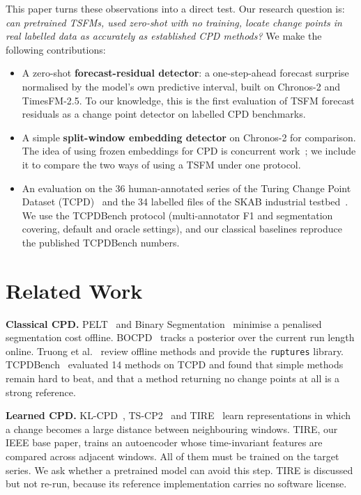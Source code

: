 \documentclass[conference]{IEEEtran}
\begin{document}
This paper turns these observations into a direct test. Our research question is: \emph{can pretrained TSFMs, used zero-shot with no training, locate change points in real labelled data as accurately as established CPD methods?} We make the following contributions:
\begin{itemize}
\item A zero-shot \textbf{forecast-residual detector}: a one-step-ahead forecast surprise normalised by the model's own predictive interval, built on Chronos-2 and TimesFM-2.5. To our knowledge, this is the first evaluation of TSFM forecast residuals as a change point detector on labelled CPD benchmarks.
\item A simple \textbf{split-window embedding detector} on Chronos-2 for comparison. The idea of using frozen embeddings for CPD is concurrent work~\cite{anon2026gasfm}; we include it to compare the two ways of using a TSFM under one protocol.
\item An evaluation on the 36 human-annotated series of the Turing Change Point Dataset (TCPD)~\cite{vandenburg2020evaluation} and the 34 labelled files of the SKAB industrial testbed~\cite{skab}. We use the TCPDBench protocol (multi-annotator F1 and segmentation covering, default and oracle settings), and our classical baselines reproduce the published TCPDBench numbers.
\end{itemize}

\section{Related Work}
\textbf{Classical CPD.} PELT~\cite{killick2012pelt} and Binary Segmentation~\cite{scott1974binseg} minimise a penalised segmentation cost offline. BOCPD~\cite{adams2007bocpd} tracks a posterior over the current run length online. Truong et al.~\cite{truong2020ruptures} review offline methods and provide the \texttt{ruptures} library. TCPDBench~\cite{vandenburg2020evaluation} evaluated 14 methods on TCPD and found that simple methods remain hard to beat, and that a method returning no change points at all is a strong reference.

\textbf{Learned CPD.} KL-CPD~\cite{chang2019klcpd}, TS-CP2~\cite{deldari2021tscp2} and TIRE~\cite{deryck2021tire} learn representations in which a change becomes a large distance between neighbouring windows. TIRE, our IEEE base paper, trains an autoencoder whose time-invariant features are compared across adjacent windows. All of them must be trained on the target series. We ask whether a pretrained model can avoid this step. TIRE is discussed but not re-run, because its reference implementation carries no software license.
\end{document}
